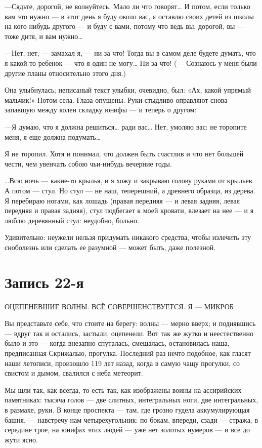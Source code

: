 \documentclass[11pt,openany]{book}
\newcommand{\bookchapterplain}[1]{%
  \clearpage\phantomsection\chapter*{#1}%
  \addcontentsline{toc}{chapter}{#1}\markboth{#1}{#1}\thispagestyle{plain}}
\begin{document}
---Сядьте, дорогой, не волнуйтесь. Мало ли что говорят\ldots{} И потом, если только вам это нужно --- в этот день я буду около вас, я оставлю своих детей из школы на кого-нибудь другого --- и буду с вами, потому что ведь вы, дорогой, вы --- тоже дитя, и вам нужно\ldots{}

---Нет, нет, --- замахал я, --- ни за что! Тогда вы в самом деле будете думать, что я какой-то ребенок --- что я один не могу\ldots{} Ни за что! (--- Сознаюсь у меня были другие планы относительно этого дня.)

Она улыбнулась; неписаный текст улыбки, очевидно, был: «Ах, какой упрямый мальчик!» Потом села. Глаза опущены. Руки стыдливо оправляют снова запавшую между колен складку юнифы --- и теперь о другом:

---Я думаю, что я должна решиться\ldots{} ради вас\ldots{} Нет, умоляю вас: не торопите меня, я еще должна подумать\ldots{}

Я не торопил. Хотя и понимал, что должен быть счастлив и что нет большей чести, чем увенчать собою чьи-нибудь вечерние годы.

\ldots{}Всю ночь --- какие-то крылья, и я хожу и закрываю голову руками от крыльев. А потом --- стул. Но стул --- не наш, теперешний, а древнего образца, из дерева. Я перебираю ногами, как лошадь (правая передняя --- и левая задняя, левая передняя и правая задняя), стул подбегает к моей кровати, влезает на нее --- и я люблю деревянный стул: неудобно, больно.

Удивительно: неужели нельзя придумать никакого средства, чтобы излечить эту сноболезнь или сделать ее разумной --- может быть, даже полезной.

\bookchapterplain{Запись 22-я}

\begin{center}\textsc{ОЦЕПЕНЕВШИЕ ВОЛНЫ. ВСЁ СОВЕРШЕНСТВУЕТСЯ. Я --- МИКРОБ}\end{center}

Вы представьте себе, что стоите на берегу: волны --- мерно вверх; и поднявшись --- вдруг так и остались, застыли, оцепенели. Вот так же жутко и неестественно было и это --- когда внезапно спуталась, смешалась, остановилась наша, предписанная Скрижалью, прогулка. Последний раз нечто подобное, как гласят наши летописи, произошло 119 лет назад, когда в самую чащу прогулки, со свистом и дымом, свалился с неба метеорит.

Мы шли так, как всегда, то есть так, как изображены воины на ассирийских памятниках: тысяча голов --- две слитных, интегральных ноги, две интегральных, в размахе, руки. В конце проспекта --- там, где грозно гудела аккумулирующая башня, --- навстречу нам четырехугольник: по бокам, впереди, сзади --- стража; в середине трое, на юнифах этих людей --- уже нет золотых нумеров --- и все до жути ясно.
\end{document}
